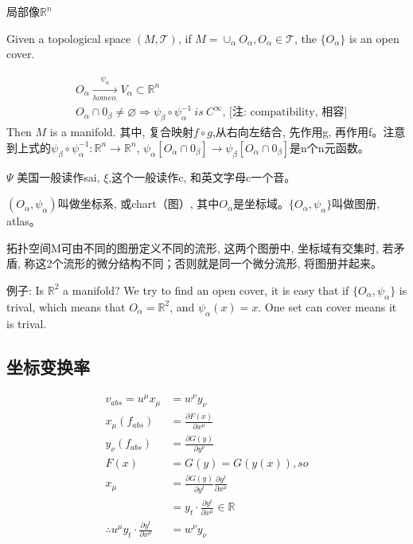 \documentclass[UTF8]{../09-Mathematics}
\begin{document}
局部像$\mathbb R ^n$


Given a topological space $(M, \mathscr T)$, if $M = \cup _ \alpha O_\alpha , O_\alpha \in \mathscr T$, the $\{ O_\alpha\}$ is an open cover.

\begin{displaymath}
  \begin{split}
    & O _\alpha \xrightarrow[homeo.]{\psi_\alpha } V_\alpha \subset \mathbb R^n \\
    & O_\alpha \cap 0_\beta \neq \varnothing \Longrightarrow \psi_\beta \circ \psi_\alpha ^ {-1} \ is \ C^ \infty \mbox{, [注: compatibility, 相容]}
  \end{split}
\end{displaymath}
Then $M$ is a manifold. 其中, 复合映射$f \circ g$,从右向左结合, 先作用g, 再作用f。注意到上式的$\psi_\beta \circ \psi_\alpha ^ {-1}: \mathbb R^n \to \mathbb R^n$, $\psi_\alpha[O_\alpha \cap 0_\beta] \to \psi_\beta[O_\alpha \cap 0_\beta] $是n个n元函数。


$\Psi$ 美国一般读作sai, $\xi$,这个一般读作c,  和英文字母c一个音。

$( O_\alpha, \psi_\alpha)$叫做坐标系, 或chart（图）, 其中$O_\alpha$是坐标域。$\{ O_\alpha, \psi_\alpha \}$叫做图册, atlas。

拓扑空间M可由不同的图册定义不同的流形, 这两个图册中, 坐标域有交集时, 若矛盾, 称这2个流形的微分结构不同；否则就是同一个微分流形, 将图册并起来。

例子: Is $\mathbb R^2$ a manifold? We try to find an open cover, it is easy that  if $\{ O_\alpha, \psi_\alpha \}$ is trival, which means that $O_\alpha = \mathbb R^2$, and $\psi_\alpha (x) = x $. One set can cover means it is trival.





\subsection{坐标变换率}


\begin{equation}
  \begin{aligned}
     v_{abs} = u^\mu x_\mu &= w^\nu y_\nu\\
     x_\mu (f_{abs}) &= \frac{\partial F(x)}{\partial x^\mu} \\
     y_\nu (f_{abs}) &= \frac{\partial G(y)}{\partial y^\nu} \\
     F(x) &= G(y) = G(y(x)),so \\
     x_\mu &= \frac{\partial G(y)}{\partial y^t} \frac{\partial y^t}{\partial x^\mu}\\
     &= y_t \cdot \frac{\partial y^t}{\partial x^\mu} \in \mathbb R \\
    \therefore u^\mu y_t \cdot \frac{\partial y^t}{\partial x^\mu} &= w^\nu y_\nu
  \end{aligned}
\end{equation}
\end{document}
